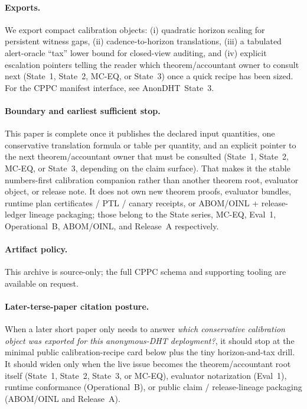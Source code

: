 \documentclass[11pt]{article}
\begin{document}
\paragraph{Exports.}
We export compact calibration objects: (i) quadratic horizon scaling for persistent witness gaps, (ii) cadence-to-horizon translations, (iii) a tabulated alert-oracle ``tax'' lower bound for closed-view auditing, and (iv) explicit escalation pointers telling the reader which theorem/accountant owner to consult next (State~1, State~2, MC-EQ, or State~3) once a quick recipe has been sized.
For the CPPC manifest interface, see AnonDHT~State~3.\cite{state3}

\paragraph{Boundary and earliest sufficient stop.}
This paper is complete once it publishes the declared input quantities, one conservative translation formula or table per quantity, and an explicit pointer to the next theorem/accountant owner that must be consulted (State~1, State~2, MC-EQ, or State~3, depending on the claim surface).
That makes it the stable numbers-first calibration companion rather than another theorem root, evaluator object, or release note. It does not own new theorem proofs, evaluator bundles, runtime plan certificates / PTL / canary receipts, or ABOM/OINL + release-ledger lineage packaging; those belong to the State series, MC-EQ, Eval~1, Operational~B, ABOM/OINL, and Release~A respectively.\cite{state1,state2,state3,series:mceq,series:eval1,series:opB,series:abom,series:releaseproperty}

\paragraph{Artifact policy.}
This archive is source-only; the full CPPC schema and supporting tooling are available on request.\cite{series:artifactpolicy}

\paragraph{Later-terse-paper citation posture.}
When a later short paper only needs to answer \emph{which conservative calibration object was exported for this anonymous-DHT deployment?}, it should stop at the minimal public calibration-recipe card below plus the tiny horizon-and-tax drill.
It should widen only when the live issue becomes the theorem/accountant root itself (State~1, State~2, State~3, or MC-EQ), evaluator notarization (Eval~1), runtime conformance (Operational~B), or public claim / release-lineage packaging (ABOM/OINL and Release~A).\cite{state1,state2,state3,series:mceq,series:eval1,series:opB,series:abom,series:releaseproperty}
\end{document}
